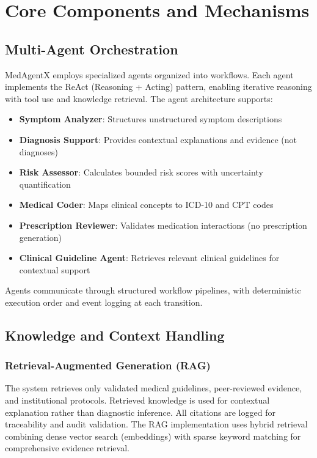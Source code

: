 \documentclass[journal]{IEEEtran}
\begin{document}
\section{Core Components and Mechanisms}

\subsection{Multi-Agent Orchestration}
MedAgentX employs specialized agents organized into workflows. Each agent implements the ReAct (Reasoning + Acting) pattern, enabling iterative reasoning with tool use and knowledge retrieval. The agent architecture supports:

\begin{itemize}
    \item \textbf{Symptom Analyzer}: Structures unstructured symptom descriptions
    \item \textbf{Diagnosis Support}: Provides contextual explanations and evidence (not diagnoses)
    \item \textbf{Risk Assessor}: Calculates bounded risk scores with uncertainty quantification
    \item \textbf{Medical Coder}: Maps clinical concepts to ICD-10 and CPT codes
    \item \textbf{Prescription Reviewer}: Validates medication interactions (no prescription generation)
    \item \textbf{Clinical Guideline Agent}: Retrieves relevant clinical guidelines for contextual support
\end{itemize}

Agents communicate through structured workflow pipelines, with deterministic execution order and event logging at each transition.

\subsection{Knowledge and Context Handling}

\subsubsection{Retrieval-Augmented Generation (RAG)}
The system retrieves only validated medical guidelines, peer-reviewed evidence, and institutional protocols. Retrieved knowledge is used for contextual explanation rather than diagnostic inference. All citations are logged for traceability and audit validation. The RAG implementation uses hybrid retrieval combining dense vector search (embeddings) with sparse keyword matching for comprehensive evidence retrieval.
\end{document}
